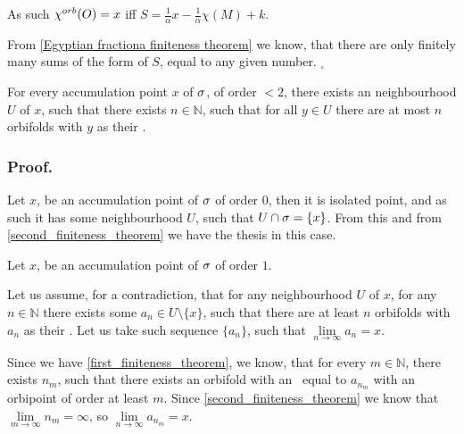 As such ${\chi^{orb}(O)} = x$ iff $S = \frac{1}{\alpha}x-\frac{1}{\alpha}\chi(M) + k$.  

From \ref{Egyptian fractiona finiteness theorem} we know, that there are only finitely many 
sums of the form of $S$, equal to any given number. $_\square $

 




\begin{theorem}\label{order <2 boundness}
For every accumulation point $x$ of ${\sigma}$, of order $<2$, there exists an neighbourhood $U$ 
of $x$, such that there exists $n \in \mathbb{N}$, such that for all $y \in U$ there are at most 
$n$ orbifolds with $y$ as their \Eoc.
\end{theorem}
\subsubsection{Proof.} 
Let $x$, be an accumulation point of ${\sigma}$ of order $0$, then it is isolated point, and as such 
it has some neighbourhood $U$, such that $U\cap {\sigma} = \{x\}$. From this and from 
\ref{second_finiteness_theorem} we have the thesis in this case. 

Let $x$, be an accumulation point of ${\sigma}$ of order $1$. 

Let us assume, for a contradiction, that for any neighbourhood $U$ of $x$,  
for any $n \in \mathbb{N}$ there exists some $a_n \in U \setminus \{x\}$, such that 
there are at least $n$ orbifolds with $a_n$ as their \Eoc. 
Let us take such sequence $\{a_n\}$, such that $\lim\limits_{n\to \infty} a_n = x$. 

Since we have \ref{first_finiteness_theorem}, we know, that for every $m \in \mathbb{N}$, 
there exists $n_m$, such that there exists an orbifold with an \Eoc\ equal to $a_{n_m}$ 
with an orbipoint of order at least $m$. Since \ref{second_finiteness_theorem} we know 
that $\lim\limits_{m\to \infty} n_m = \infty$, 
so $\lim\limits_{n\to \infty} a_{n_m} = x$. 


